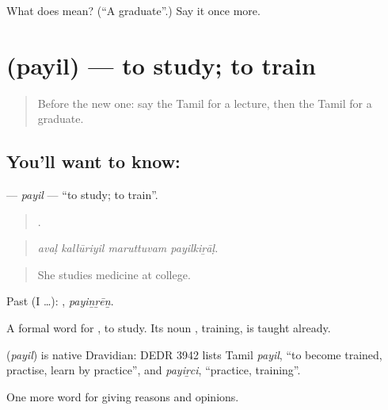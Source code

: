 \begin{tcolorbox}[breakable,colback=teal!4,colframe=teal!35!black,title={Before you move on}]
What does  mean? (\textquotedblleft{}A graduate\textquotedblright{}.) Say it once more.
\end{tcolorbox}
\section[\texorpdfstring{\ta{பயில்} (payil)}{பயில் (payil)}]{ (payil) — to study; to train}

\label{lesson:TA-C364-payil}



\begin{quote}
Before the new one: say the Tamil for a lecture, then the Tamil for a graduate.
\end{quote}

\subsection*{You'll want to know: }
\textbf{} — \emph{payil} — \textquotedblleft{}to study; to train\textquotedblright{}.

\begin{quote}
   .
\end{quote}

\begin{quote}
\emph{avaḷ kallūriyil maruttuvam payilkiṟāḷ.}
\end{quote}

\begin{quote}
She studies medicine at college.
\end{quote}

Past (I …): , \emph{payiṉṟēṉ}.

A formal word for , to study. Its noun , training, is taught already.

\begin{cousinweb}
\textbf{} (\emph{payil}) is native Dravidian: DEDR 3942 lists Tamil \emph{payil}, \textquotedblleft{}to become trained, practise, learn by practice\textquotedblright{}, and \emph{payiṟci}, \textquotedblleft{}practice, training\textquotedblright{}.
\end{cousinweb}

\begin{grammarlens}[title={What you've built}]
One more word for giving reasons and opinions.
\end{grammarlens}

